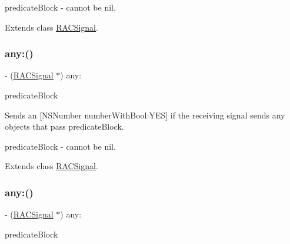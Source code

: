 predicate\+Block -\/ cannot be nil. 

Extends class \mbox{\hyperlink{interface_r_a_c_signal_a4bfb6af6556526457fbf0e5d3c878536}{R\+A\+C\+Signal}}.

\mbox{\label{category_r_a_c_signal_07_operations_08_a4bfb6af6556526457fbf0e5d3c878536}} 
\subsubsection{\texorpdfstring{any\+:()}{any:()}\hspace{0.1cm}{\footnotesize\ttfamily [2/3]}}
{\footnotesize\ttfamily -\/ (\mbox{\hyperlink{interface_r_a_c_signal}{R\+A\+C\+Signal}} $\ast$) any\+: \begin{DoxyParamCaption}\item[{(B\+O\+OL($^\wedge$)(id object))}]{predicate\+Block }\end{DoxyParamCaption}}

Sends an \mbox{[}N\+S\+Number number\+With\+Bool\+:Y\+ES\mbox{]} if the receiving signal sends any objects that pass {\ttfamily predicate\+Block}.

predicate\+Block -\/ cannot be nil. 

Extends class \mbox{\hyperlink{interface_r_a_c_signal_a4bfb6af6556526457fbf0e5d3c878536}{R\+A\+C\+Signal}}.

\mbox{\label{category_r_a_c_signal_07_operations_08_a4bfb6af6556526457fbf0e5d3c878536}} 
\subsubsection{\texorpdfstring{any\+:()}{any:()}\hspace{0.1cm}{\footnotesize\ttfamily [3/3]}}
{\footnotesize\ttfamily -\/ (\mbox{\hyperlink{interface_r_a_c_signal}{R\+A\+C\+Signal}} $\ast$) any\+: \begin{DoxyParamCaption}\item[{(B\+O\+OL($^\wedge$)(id object))}]{predicate\+Block }\end{DoxyParamCaption}}

